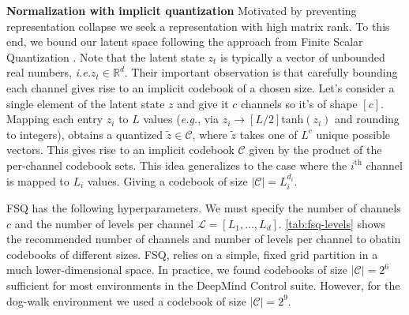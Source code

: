 \documentclass{article}
\makeatletter
\theoremstyle{plain}
\theoremstyle{definition}
\theoremstyle{remark}
\newcommand{\eg}{\textit{e.g.\@}\xspace}
\newcommand{\ie}{\textit{i.e.\@}\xspace}
\newcommand{\R}{\mathbb{R}}
\makeatother
\begin{document}
\textbf{Normalization with implicit quantization}
Motivated by preventing representation collapse we seek a representation with high matrix rank.
To this end, we bound our latent space following the approach from
Finite Scalar Quantization \citep[FSQ,][]{mentzerFiniteScalarQuantization2023}.
Note that the latent state $z_{t}$ is typically a vector of unbounded real numbers, \ie $z_{t} \in \R^{d}$.
Their important observation is that carefully bounding each channel gives rise to an implicit codebook of a chosen size.
Let's consider a single element of the latent state $z$ and give it $c$ channels so it's of shape $[c]$.
Mapping each entry $z_{i}$ to $L$ values (\eg, via $z_{i} \rightarrow [L/2] \text{tanh}(z_{i})$ and rounding to integers),
obtains a quantized $\tilde{z} \in \mathcal{C}$, where $\tilde{z}$ takes one of $L^{c}$ unique possible vectors.
This gives rise to an implicit codebook $\mathcal{C}$ given by the product of the per-channel codebook sets.
This idea generalizes to the case where the $i^{\text{th}}$ channel is mapped to $L_{i}$ values.
Giving a codebook of size $|\mathcal{C}| = L_{i}^{d_{i}}$.

FSQ has the following hyperparameters. We must specify the number of channels $c$ and the number of levels per channel
$\mathcal{L} = [L_{1},\ldots,L_{d}]$.
\cref{tab:fsq-levels} shows the recommended number of channels and number of levels per channel to obatin codebooks of
different sizes.
FSQ, relies on a simple, fixed grid partition in a much
lower-dimensional space.
In practice, we found codebooks of size $|\mathcal{C}|=2^{6}$ sufficient for most environments in the DeepMind Control suite.
However, for the dog-walk environment we used a codebook of size $|\mathcal{C}|=2^{9}$.



\end{document}
